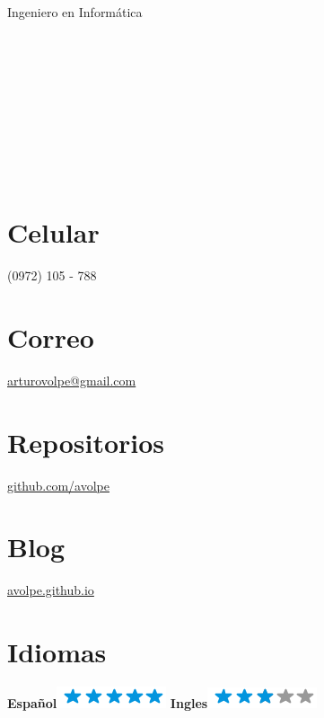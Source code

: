 \documentclass[]{friggeri-cv}
\begin{document}
{Ingeniero en Informática}


\begin{aside}
	\section{}~
    \section{}~
    \section{}~
    \section{Celular}
        (0972) 105 - 788
        ~
    \section{Correo}
        \href{mailto:arturovolpe@gmail.com}{arturovolpe@gmail.com}
        ~
    \section{Repositorios}
        \href{https://github.com/avolpe}{github.com/avolpe}
        ~
    \section{Blog}
        \href{https://avolpe.github.io}{avolpe.github.io}
        ~
\section{Idiomas}
\textbf{Español}\includegraphics[scale=0.40]{img/5stars.png}
\textbf{Ingles}\includegraphics[scale=0.40]{img/3stars.png}
\end{aside}
\end{document}
